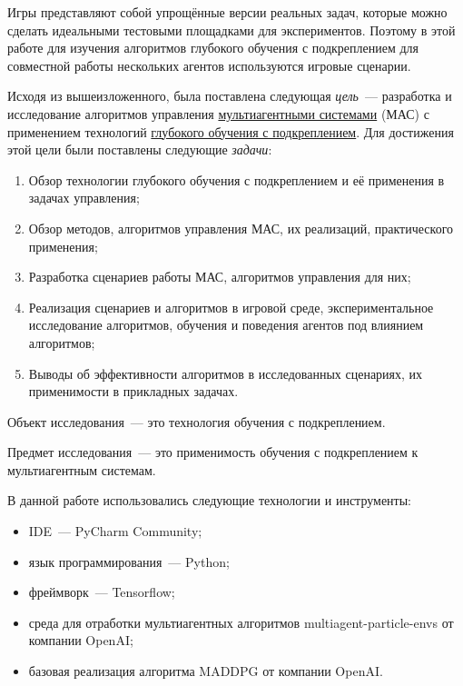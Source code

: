 Игры представляют собой упрощённые версии реальных задач, которые можно сделать идеальными тестовыми площадками для экспериментов. Поэтому в этой работе для изучения алгоритмов глубокого обучения с подкреплением для совместной работы нескольких агентов используются игровые сценарии.

Исходя из вышеизложенного, была поставлена следующая \textit{цель}~--- разработка и исследование алгоритмов управления \hyperref[acr:rl]{мультиагентными системами} (МАС) с применением технологий \hyperref[acr:drl]{глубокого обучения с подкреплением}. Для достижения этой цели были поставлены следующие \textit{задачи}:

\begin{enumerate}
    \item Обзор технологии глубокого обучения с подкреплением и её применения в задачах управления;
    \item Обзор методов, алгоритмов управления МАС, их реализаций, практического применения;
    \item Разработка сценариев работы МАС, алгоритмов управления для них;
    \item Реализация сценариев и алгоритмов в игровой среде, экспериментальное исследование алгоритмов, обучения и поведения агентов под влиянием алгоритмов;
    \item Выводы об эффективности алгоритмов в исследованных сценариях, их применимости в прикладных задачах.
\end{enumerate}

Объект исследования~--- это технология обучения с подкреплением.

Предмет исследования~--- это применимость обучения с подкреплением к мультиагентным системам.

В данной работе использовались следующие технологии и инструменты:

\begin{itemize}
    \item IDE~--- PyCharm Community;
    \item язык программирования~--- Python;
    \item фреймворк~--- Tensorflow;
    \item среда для отработки мультиагентных алгоритмов multiagent-particle-envs \cite{multiagent-particle-envs} от компании OpenAI;
    \item базовая реализация алгоритма MADDPG \cite{lowe2017multiagent} от компании OpenAI.
\end{itemize}

